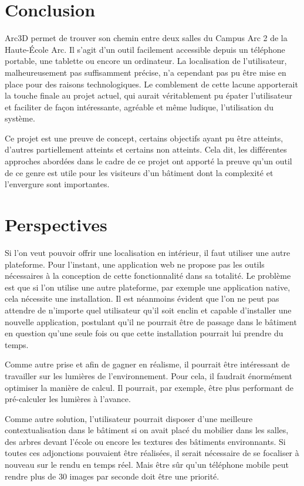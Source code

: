 \section{Conclusion}
Arc3D permet de trouver son chemin entre deux salles du Campus Arc 2 de la Haute-École Arc. Il s'agit d'un outil facilement accessible depuis un téléphone portable, une tablette ou encore un ordinateur. La localisation de l'utilisateur, malheureusement pas suffisamment précise, n'a cependant pas pu être mise en place pour des raisons technologiques. Le comblement de cette lacune apporterait la touche finale au projet actuel, qui aurait véritablement pu épater l'utilisateur et faciliter de façon intéressante, agréable et même ludique, l'utilisation du système.

Ce projet est une preuve de concept, certains objectifs ayant pu être atteints, d'autres partiellement atteints et certains non atteints. Cela dit, les différentes approches abordées dans le cadre de ce projet ont apporté la preuve qu'un outil de ce genre est utile pour les visiteurs d'un bâtiment dont la complexité et l'envergure sont importantes.

\section{Perspectives}
Si l'on veut pouvoir offrir une localisation en intérieur, il faut utiliser une autre plateforme. Pour l'instant, une application web ne propose pas les outils nécessaires à la conception de cette fonctionnalité dans sa totalité. Le problème est que si l'on utilise une autre plateforme, par exemple une application native, cela nécessite une installation. Il est néanmoins évident que l'on ne peut pas attendre de n'importe quel utilisateur qu'il soit enclin et capable d'installer une nouvelle application, postulant qu'il ne pourrait être de passage dans le bâtiment en question qu'une seule fois ou que cette installation pourrait lui prendre du temps. 

Comme autre prise et afin de gagner en réalisme, il pourrait être intéressant de travailler sur les lumières de l'environnement. Pour cela, il faudrait énormément optimiser la manière de calcul. Il pourrait, par exemple, être plus performant de pré-calculer les lumières à l'avance.

Comme autre solution, l'utilisateur pourrait disposer d'une meilleure contextualisation dans le bâtiment si on avait placé du mobilier dans les salles, des arbres devant l'école ou encore les textures des bâtiments environnants. Si toutes ces adjonctions pouvaient être réalisées, il serait nécessaire de se focaliser à nouveau sur le rendu en temps réel. Mais être sûr qu'un téléphone mobile peut rendre plus de 30 images par seconde doit être une priorité.